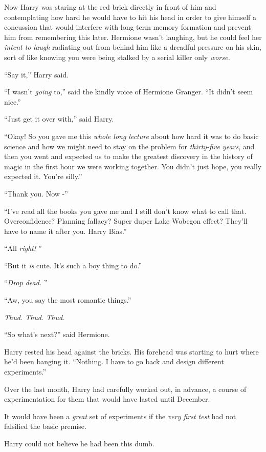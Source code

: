Now Harry was staring at the red brick directly in front of him and
contemplating how hard he would have to hit his head in order to give
himself a concussion that would interfere with long-term memory
formation and prevent him from remembering this later. Hermione wasn't
laughing, but he could feel her \emph{intent to laugh} radiating out
from behind him like a dreadful pressure on his skin, sort of like
knowing you were being stalked by a serial killer only \emph{worse.}

``Say it,'' Harry said.

``I wasn't \emph{going} to,'' said the kindly voice of Hermione Granger.
``It didn't seem nice.''

``Just get it over with,'' said Harry.

``Okay! So you gave me this \emph{whole long lecture} about how hard it
was to do basic science and how we might need to stay on the problem for
\emph{thirty-five years}, and then you went and expected us to make the
greatest discovery in the history of magic in the first hour we were
working together. You didn't just hope, you really expected it. You're
silly.''

``Thank you. Now -''

``I've read all the books you gave me and I still don't know what to
call that. Overconfidence? Planning fallacy? Super duper Lake Wobegon
effect? They'll have to name it after you. Harry Bias.''

``All \emph{right!} ''

``But it \emph{is} cute. It's such a boy thing to do.''

``\emph{Drop dead.} ''

``Aw, you say the most romantic things.''

\emph{Thud. Thud. Thud.}

``So what's next?'' said Hermione.

Harry rested his head against the bricks. His forehead was starting to
hurt where he'd been banging it. ``Nothing. I have to go back and design
different experiments.''

Over the last month, Harry had carefully worked out, in advance, a
course of experimentation for them that would have lasted until
December.

It would have been a \emph{great} set of experiments if the \emph{very
first test} had not falsified the basic premise.

Harry could not believe he had been this dumb.

